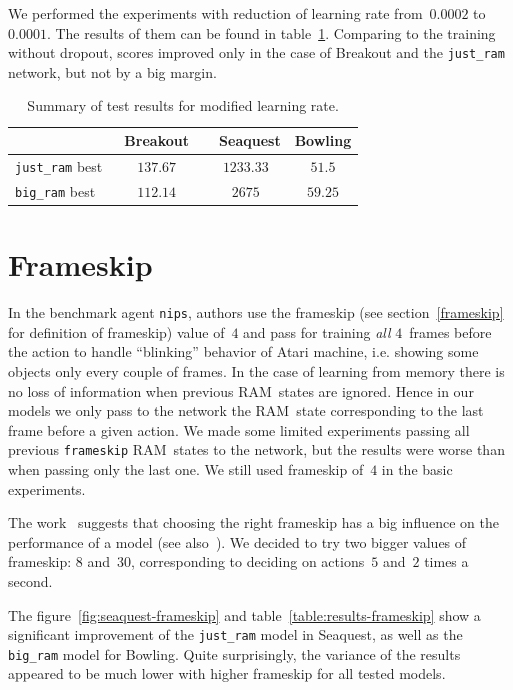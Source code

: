 We performed the experiments with reduction of learning rate from~$0.0002$ to~$0.0001$. The results of them can be found in table~\ref{table:rate}. Comparing to the training without dropout, scores improved only in the case of Breakout and the \texttt{just\_ram} network, but not by a big margin.

\begin{table}[h]
\centering
\begin{tabularx}{0.7\textwidth}{ X c c c }
  \toprule
  &\ Breakout\ &\ Seaquest & Bowling \\
  \midrule
  \texttt{just\_ram} best & $137.67$ & $1233.33$ & $51.5$ \\
  \texttt{big\_ram} best  & $112.14$ & $2675$ & $59.25$ \\
  \bottomrule
\end{tabularx}
\caption{Summary of test results for modified learning rate.}
\label{table:rate}
\end{table}
\section{Frameskip}\label{our-frameskip}
In the benchmark agent \texttt{nips}, authors use the frameskip (see section~\ref{frameskip} for definition of frameskip) value of~$4$ and pass for training \emph{all} $4$~frames before the action to handle ``blinking'' behavior of Atari machine, i.e. showing some objects only every couple of frames.
In the case of learning from memory there is no loss of information when previous RAM~states are ignored. Hence in our models we only pass to the network the RAM~state corresponding to the last frame before a given action. We made some limited experiments passing all previous \texttt{frameskip} RAM~states to the network, but the results were worse than when passing only the last one. We still used frameskip of~$4$ in the basic experiments.

The work~\cite{frameskip} suggests that choosing the right frameskip has a big influence on the performance of a model (see also~\cite{microsoft-frameskip}). We decided to try two bigger values of frameskip: $8$ and~$30$, corresponding to deciding on actions~$5$ and~$2$ times a second.

The figure~\ref{fig:seaquest-frameskip} and table~\ref{table:results-frameskip} show a significant improvement of the \texttt{just\_ram} model in Seaquest, as well as the \texttt{big\_ram} model for Bowling. Quite surprisingly, the variance of the results appeared to be much lower with higher frameskip for all tested models.

